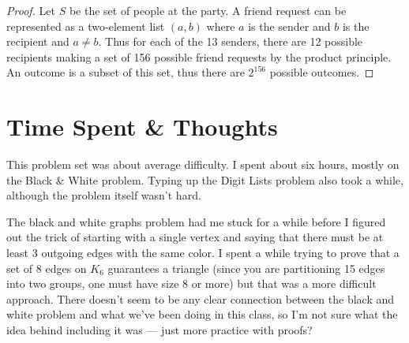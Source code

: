 \documentclass[12pt]{article}
\begin{document}
\begin{proof}
Let $S$ be the set of people at the party. A friend request can be represented as a two-element list $(a, b)$ where $a$ is the sender and $b$ is the recipient and $a \neq b$. Thus for each of the 13 senders, there are 12 possible recipients making a set of 156 possible friend requests by the product principle. An outcome is a subset of this set, thus there are $2^{156}$ possible outcomes. 
\end{proof}

\section{Time Spent \& Thoughts}

This problem set was about average difficulty. I spent about six hours, mostly on the Black \& White problem. Typing up the Digit Lists problem also took a while, although the problem itself wasn't hard.

 The black and white graphs problem had me stuck for a while before I figured out the trick of starting with a single vertex and saying that there must be at least 3 outgoing edges with the same color.  I spent a while trying to prove that a set of 8 edges on $K_6$ guarantees a triangle (since you are partitioning 15 edges into two groups, one must have size 8 or more) but that was a more difficult approach. There doesn't seem to be any clear connection between the black and white problem and what we've been doing in this class, so I'm not sure what the idea behind including it was --- just more practice with proofs?
\end{document}
